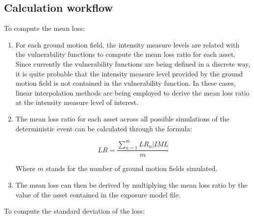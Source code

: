 \subsection{Calculation workflow}

To compute the mean loss:

\begin{enumerate}
\item For each ground motion field, the intensity measure levels are related with the vulnerability functions to compute the mean loss ratio for each asset. Since currently the vulnerability functions are being defined in a discrete way, it is quite probable that the intensity measure level provided by the ground motion field is not contained in the vulnerability function. In these cases, linear interpolation methods are being employed to derive the mean loss ratio at the intensity measure level of interest.

\item The mean loss ratio for each asset across all possible simulations of the deterministic event can be calculated through the formula:

\begin{equation}
LR=\frac{\sum^m_{n=1}LR_n|IML}{m}
\end{equation}

Where $m$ stands for the number of ground motion fields simulated.

\item The mean loss can then be derived by multiplying the mean loss ratio by the value of the asset contained in the exposure model file.

\end{enumerate}

To compute the standard deviation of the loss:

